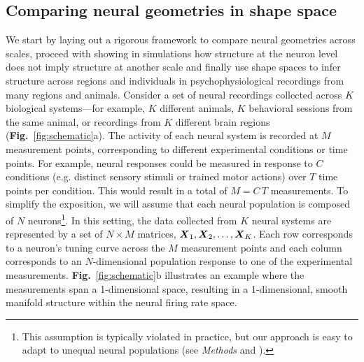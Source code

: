 \subsection{Comparing neural geometries in shape space}


We start by laying out a rigorous framework to compare neural geometries across scales, proceed with showing in simulations how structure at the neuron level does not imply structure at another scale and finally use shape spaces to infer structure across regions and individuals in psychophysiological recordings from many regions and animals. Consider a set of neural recordings collected across $K$ biological systems---for example, $K$ different animals, $K$ behavioral sessions from the same animal, or recordings from $K$ different brain regions (\textbf{Fig.}~\ref{fig:schematic}a).
The activity of each neural system is recorded at $M$ measurement points, corresponding to different experimental conditions or time points.
For example, neural responses could be measured in response to $C$ conditions (e.g. distinct sensory stimuli or trained motor actions) over $T$ time points per condition.
This would result in a total of $M = C\,T$ measurements.
To simplify the exposition, we will assume that each neural population is composed of $N$ neurons\footnote{This assumption is typically violated in practice, but our approach is easy to adapt to unequal neural populations (see \textit{Methods} and \cite{harvey2024duality}).}. In this setting, the data collected from $K$ neural systems are represented by a set of $N \times M$ matrices, $\boldsymbol{X}_1, \boldsymbol{X}_2, \dots, \boldsymbol{X}_K$.
Each row corresponds to a neuron's tuning curve across the $M$ measurement points and each column corresponds to an $N$-dimensional population response to one of the experimental measurements.
\textbf{Fig.}~\ref{fig:schematic}b illustrates an example where the measurements span a 1-dimensional space, resulting in a 1-dimensional, smooth manifold structure within the neural firing rate space.

